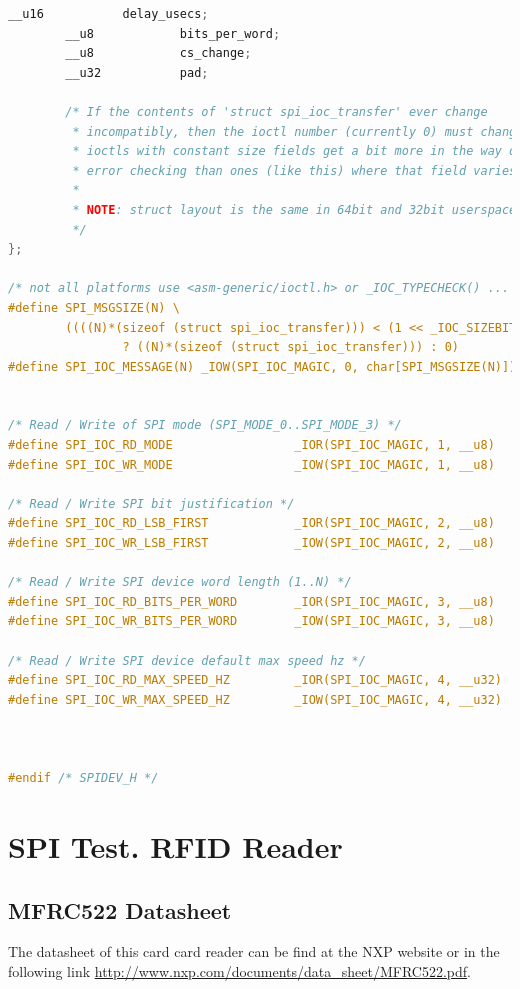 \begin{lstlisting}[language=C, caption={linux/spi/spidev.h}]
        __u16           delay_usecs;
        __u8            bits_per_word;
        __u8            cs_change;
        __u32           pad;

        /* If the contents of 'struct spi_ioc_transfer' ever change
         * incompatibly, then the ioctl number (currently 0) must change;
         * ioctls with constant size fields get a bit more in the way of
         * error checking than ones (like this) where that field varies.
         *
         * NOTE: struct layout is the same in 64bit and 32bit userspace.
         */
};

/* not all platforms use <asm-generic/ioctl.h> or _IOC_TYPECHECK() ... */
#define SPI_MSGSIZE(N) \
        ((((N)*(sizeof (struct spi_ioc_transfer))) < (1 << _IOC_SIZEBITS)) \
                ? ((N)*(sizeof (struct spi_ioc_transfer))) : 0)
#define SPI_IOC_MESSAGE(N) _IOW(SPI_IOC_MAGIC, 0, char[SPI_MSGSIZE(N)])


/* Read / Write of SPI mode (SPI_MODE_0..SPI_MODE_3) */
#define SPI_IOC_RD_MODE                 _IOR(SPI_IOC_MAGIC, 1, __u8)
#define SPI_IOC_WR_MODE                 _IOW(SPI_IOC_MAGIC, 1, __u8)

/* Read / Write SPI bit justification */
#define SPI_IOC_RD_LSB_FIRST            _IOR(SPI_IOC_MAGIC, 2, __u8)
#define SPI_IOC_WR_LSB_FIRST            _IOW(SPI_IOC_MAGIC, 2, __u8)

/* Read / Write SPI device word length (1..N) */
#define SPI_IOC_RD_BITS_PER_WORD        _IOR(SPI_IOC_MAGIC, 3, __u8)
#define SPI_IOC_WR_BITS_PER_WORD        _IOW(SPI_IOC_MAGIC, 3, __u8)

/* Read / Write SPI device default max speed hz */
#define SPI_IOC_RD_MAX_SPEED_HZ         _IOR(SPI_IOC_MAGIC, 4, __u32)
#define SPI_IOC_WR_MAX_SPEED_HZ         _IOW(SPI_IOC_MAGIC, 4, __u32)



#endif /* SPIDEV_H */
\end{lstlisting}

\section{SPI Test. RFID Reader}\label{S:linux-spi-spidev}
\subsection{MFRC522 Datasheet}\label{SS:Libs-MFRC522-Datasheet}
The datasheet of this card card reader can be find at the NXP website or in the following link \url{http://www.nxp.com/documents/data_sheet/MFRC522.pdf}.
\\
